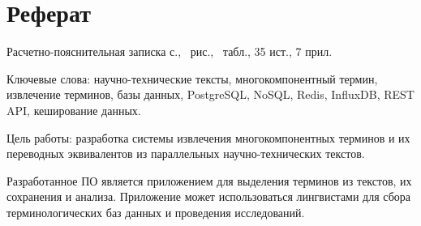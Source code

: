 \section*{Реферат}

Расчетно-пояснительная записка \pageref{LastPage} с., \totalfigures\ рис., \totaltables\ табл., 35 ист., 7 прил.

Ключевые слова: научно-технические тексты, многокомпонентный термин, извлечение терминов, базы данных, PostgreSQL, NoSQL, Redis, InfluxDB, REST API, кеширование данных.


Цель работы: разработка системы извлечения многокомпонентных терминов и их переводных эквивалентов из параллельных научно-технических текстов.

Разработанное ПО является приложением для выделения терминов из текстов, их сохранения и анализа. Приложение может использоваться лингвистами для сбора терминологических баз данных и проведения исследований.



\pagebreak
